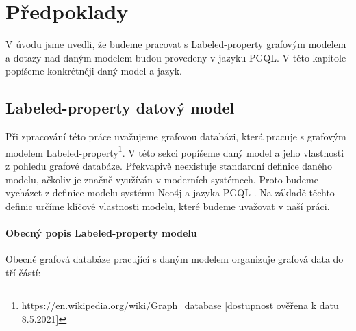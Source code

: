 \chapter{Předpoklady}
\label{requirements}

V úvodu jsme uvedli, že budeme pracovat s Labeled-property grafovým modelem a dotazy nad daným modelem budou provedeny v jazyku PGQL.
V této kapitole popíšeme konkrétněji daný model a jazyk.

\section{Labeled-property datový model}
\label{req.propGraph}

Při zpracování této práce uvažujeme grafovou databázi, která pracuje s grafovým modelem Labeled-property\footnote{\url{https://en.wikipedia.org/wiki/Graph_database} [dostupnost ověřena k datu 8.5.2021]}.
V této sekci popíšeme daný model a jeho vlastnosti z pohledu grafové databáze.
Překvapivě neexistuje standardní definice daného modelu, ačkoliv je značně využíván v moderních systémech.
Proto budeme vycházet z definice modelu systému Neo4j \citep{neopropertygraph} a jazyka PGQL \citep{pgql}.
Na základě těchto definic určíme klíčové vlastnosti modelu, které budeme uvažovat v naší práci.

\subsubsection{Obecný popis Labeled-property modelu}

Obecně grafová databáze pracující s daným modelem organizuje grafová data do tří částí:

